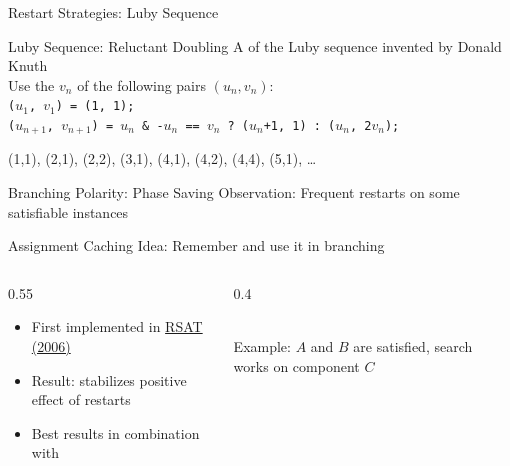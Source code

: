 \documentclass[t]{sdqbeamer}
\begin{document}
\begin{frame}{Restart Strategies: Luby Sequence}
\begin{block}{Luby Sequence: Reluctant Doubling}
A  of the Luby sequence invented by Donald Knuth\\[1ex]
Use the $v_n$ of the following pairs $(u_n, v_n)$:\\[1ex]
\texttt{($u_1$, $v_1$) = (1, 1);}\\
\texttt{($u_{n+1}$, $v_{n+1}$) = $u_n$ \& -$u_n$ == $v_n$\ ?\ ($u_n$+1, 1) :\ ($u_n$, 2$v_n$);}
\end{block}
\begin{example}
(1,1), (2,1), (2,2), (3,1), (4,1), (4,2), (4,4), (5,1), \ldots
\end{example}
\end{frame}


		
\begin{frame}{Branching Polarity: Phase Saving}
Observation: Frequent {restarts}  on some satisfiable instances\\[1em]
\begin{block}{Assignment Caching}
Idea: Remember  and use it  in branching
\begin{columns}[T]
\begin{column}{0.55\textwidth}
\begin{itemize}\setlength{\itemsep}{1em}
	\item First implemented in \href{http://reasoning.cs.ucla.edu/rsat/}{RSAT (2006)}
	\item Result:  stabilizes positive effect of restarts
	\item Best results in combination with 
\end{itemize}
\end{column}
\begin{column}{0.4\textwidth}
\centering
{}~\\
Example: $A$ and $B$ are satisfied, search works on component $C$
\end{column}
\end{columns}
\end{block}
\end{frame}
\end{document}
